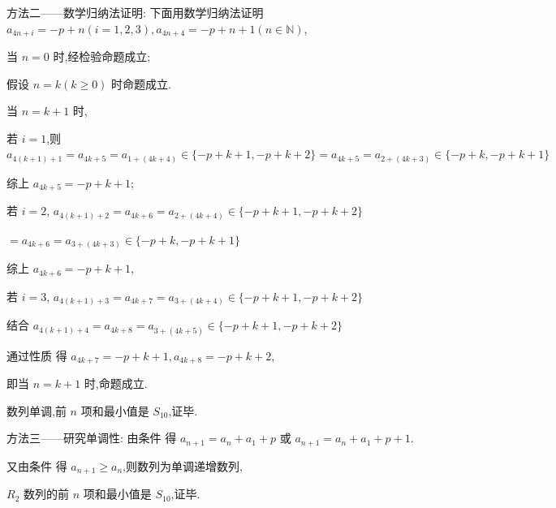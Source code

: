 \begin{solutions}
方法二——数学归纳法证明:
下面用数学归纳法证明 $a_{4n+i}=-p+n (i=1, 2, 3), a_{4n+4}=-p+n+1 (n \in \mathbb{N})$,

当 $n=0$ 时,经检验命题成立;

假设 $n=k (k \geqslant 0)$ 时命题成立.

当 $n=k+1$ 时,

若 $i=1$,则 $a_{4(k+1)+1}=a_{4k+5}=a_{1+(4k+4)} \in \{-p+k+1, -p+k+2\}=a_{4k+5}=a_{2+(4k+3)} \in \{-p+k, -p+k+1\}$

综上 $a_{4k+5}=-p+k+1$;

若 $i=2$, $a_{4(k+1)+2}=a_{4k+6}=a_{2+(4k+4)} \in \{-p+k+1, -p+k+2\}$

$=a_{4k+6}=a_{3+(4k+3)} \in \{-p+k, -p+k+1\}$

综上 $a_{4k+6}=-p+k+1$,

若 $i=3$, $a_{4(k+1)+3}=a_{4k+7}=a_{3+(4k+4)} \in \{-p+k+1, -p+k+2\}$

结合 $a_{4(k+1)+4}=a_{4k+8}=a_{3+(4k+5)} \in \{-p+k+1, -p+k+2\}$

通过性质  得 $a_{4k+7}=-p+k+1, a_{4k+8}=-p+k+2$,

即当 $n=k+1$ 时,命题成立.

数列单调,前 $n$ 项和最小值是 $S_{10}$,证毕.

方法三——研究单调性:
由条件  得 $a_{n+1}=a_n+a_1+p$ 或 $a_{n+1}=a_n+a_1+p+1$.

又由条件  得 $a_{n+1} \geqslant a_n$,则数列为单调递增数列,

$R_2$ 数列的前 $n$ 项和最小值是 $S_{10}$,证毕.
\end{solutions}
